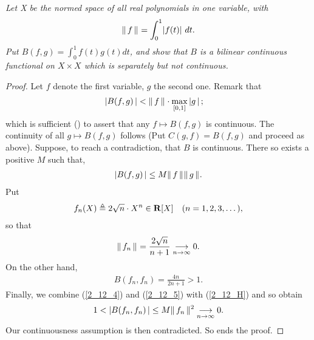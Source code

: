 \textit{%
Let X be the normed space of all real polynomials in one variable, with %
%
  \begin{align*}
    \| \,f \, \|_{}=\int_0^1\lvert f(t)\rvert\ dt.
\end{align*}
%
Put  %
  $B(f, g)=\int _0^1 f(t)g(t) dt $, %
%
and show that $B$ is a bilinear continuous functional on $X\times X$ %
which is separately but not continuous.
}
\begin{proof} Let $f$ denote the first variable, $g$ the second one. %
Remark that %
%
  \begin{align}\label{2_12_2}
    \left\lvert B(f, g) \,\right\rvert 
      & < \| \,f \, \|_{} \cdot \max_{[0,1]} \left\lvert g \,\right\rvert ; 
  \end{align}
%
which is sufficient () to assert that any %
%
  $f \mapsto B(f, g)$ 
%
is continuous. The continuity of all %
%
  $g \mapsto B(f,g)$ %
%
follows (Put $C(g, f) = B(f, g)$ and proceed as above). %
Suppose, to reach a contradiction, that $B$ is continuous. %
There so exists a positive $M$ such that, 
%
  \begin{align}\label{2_12_H}
    \left\lvert B(f, g) \,\right\rvert \leq M \| \,f \, \|_{}\| \,g \, \|_{}.
  \end{align}
%
Put %
%
  \begin{align}\label{2_12_3}
    f_n(X)\triangleq 2 \sqrt{n}\cdot X^{n}\in {\mathbf R}[X] \quad (n=1, 2, 3, \dots), 
  \end{align}
%
so that 
%
  \begin{align}\label{2_12_4}
    \| \,f_n \, \|_{} = \frac{2 \sqrt{n}}{n+1} \underset{n\to \infty}{\longrightarrow}0.
  \end{align}
%
On the other hand,
%
  \begin{align}\label{2_12_5}
    B(f_n, f_n)= \frac{4 n}{2n+1} > 1.
  \end{align}
%
Finally, we combine %
%
  (\ref{2_12_4}) and (\ref{2_12_5}) with (\ref{2_12_H}) %
%
and so obtain
\begin{align}
 1 < \left\lvert B(f_n, f_n) \,\right\rvert \leq  M \| \,f_n \, \|_{}^2  \underset{n\to \infty}{\longrightarrow} 0.
\end{align}
Our continuousness assumption is then contradicted. So ends the proof.
\end{proof}
